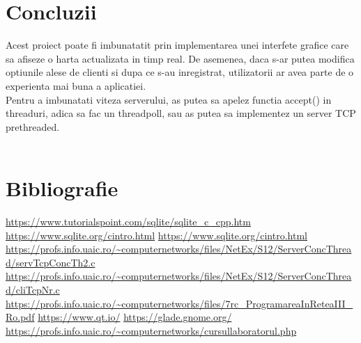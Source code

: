 \documentclass[runningheads]{llncs}
\begin{document}
\section {Concluzii}

Acest proiect poate fi imbunatatit prin implementarea unei interfete grafice care sa afiseze o harta actualizata in timp real. De asemenea, daca s-ar putea modifica optiunile alese de clienti si dupa ce s-au inregistrat, utilizatorii ar avea parte de o experienta mai buna a aplicatiei.\\

Pentru a imbunatati viteza serverului, as putea sa apelez functia accept() in threaduri, adica sa fac un threadpoll, sau as putea sa implementez un server TCP prethreaded.
\\
\\
\section {Bibliografie}
\begin{thebibliography}{8}
\url{https://www.tutorialspoint.com/sqlite/sqlite\_c\_cpp.htm}
\url{https://www.sqlite.org/cintro.html}
\url{https://www.sqlite.org/cintro.html}
\url{https://profs.info.uaic.ro/~computernetworks/files/NetEx/S12/ServerConcThread/servTcpConcTh2.c}
\url{https://profs.info.uaic.ro/~computernetworks/files/NetEx/S12/ServerConcThread/cliTcpNr.c}
\url{https://profs.info.uaic.ro/~computernetworks/files/7rc\_ProgramareaInReteaIII\_Ro.pdf}
\url{https://www.qt.io/}
\url{https://glade.gnome.org/}
\url{https://profs.info.uaic.ro/~computernetworks/cursullaboratorul.php}

\end{thebibliography}
\end{document}
